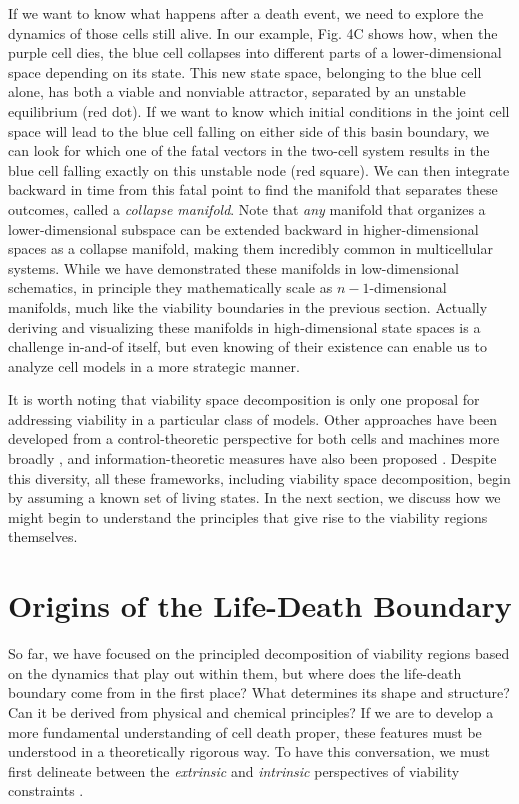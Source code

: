 \documentclass{article}
\begin{document}
If we want to know what happens after a death event, we need to explore the dynamics of those cells still alive. In our example, Fig. 4C shows how, when the purple cell dies, the blue cell collapses into different parts of a lower-dimensional space depending on its state. This new state space, belonging to the blue cell alone, has both a viable and nonviable attractor, separated by an unstable equilibrium (red dot). If we want to know which initial conditions in the joint cell space will lead to the blue cell falling on either side of this basin boundary, we can look for which one of the fatal vectors in the two-cell system results in the blue cell falling exactly on this unstable node (red square). We can then integrate backward in time from this fatal point to find the manifold that separates these outcomes, called a \textit{collapse manifold}. Note that \textit{any }manifold that organizes a lower-dimensional subspace can be extended backward in higher-dimensional spaces as a collapse manifold, making them incredibly common in multicellular systems. While we have demonstrated these manifolds in low-dimensional schematics, in principle they mathematically scale as \(n-1\)-dimensional manifolds, much like the viability boundaries in the previous section. Actually deriving and visualizing these manifolds in high-dimensional state spaces is a challenge in-and-of itself, but even knowing of their existence can enable us to analyze cell models in a more strategic manner.

It is worth noting that viability space decomposition is only one proposal for addressing viability in a particular class of models. Other approaches have been developed from a control-theoretic perspective for both cells \cite{himeoka_theoretical_2024} and machines more broadly \cite{aubin_viability_2011}, and information-theoretic measures have also been proposed \cite{egbert_methods_2018, kolchinsky_semantic_2018,bartlett_physics_2025}. Despite this diversity, all these frameworks, including viability space decomposition, begin by assuming a known set of living states. In the next section, we discuss how we might begin to understand the principles that give rise to the viability regions themselves.

 \section{Origins of the Life-Death Boundary}

So far, we have focused on the principled decomposition of viability regions based on the dynamics that play out within them, but where does the life-death boundary come from in the first place? What determines its shape and structure? Can it be derived from physical and chemical principles? If we are to develop a more fundamental understanding of cell death proper, these features must be understood in a theoretically rigorous way. To have this conversation, we must first delineate between the \textit{extrinsic} and \textit{intrinsic} perspectives of viability constraints \cite{mcshaffrey_decomposing_2023, beer_deriving_2024}.
\end{document}
